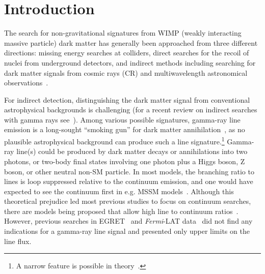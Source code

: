 \documentclass[aps,twocolumn,prd,superscriptaddress,showpacs,nofootinbib,fixfloat]{revtex4}
\newcommand{\Fermi}{{\slshape Fermi}}
\begin{document}

\maketitle




\section{Introduction}


The search for non-gravitational signatures from WIMP
(weakly interacting massive particle) dark matter has 
generally been approached from three different directions: missing
energy searches at colliders, direct searches for the
recoil of nuclei from underground detectors, and indirect
methods including searching for dark matter signals from cosmic
rays (CR) and multiwavelength astronomical
observations~\citep{Jungman:1995df, Bergstrom:2000, Bertone:2005, Hooper:2007Review,
2012arXiv1205.4882B, Cirelli:2012tf}.

For indirect detection, distinguishing the dark matter
signal from conventional astrophysical backgrounds is
challenging
(for a recent review on indirect searches with gamma rays
see~\cite{Bringmann:2012ez}).
Among various possible signatures, gamma-ray
line emission is a long-sought ``smoking
gun'' for dark matter annihilation~\cite{Bergstrom:1988fp}, as no plausible
astrophysical background can produce such a line
signature.\footnote{A narrow feature is
possible in theory~\citep[see][]{2012arXiv1207.0458A}.}  Gamma-ray line(s)
could be produced by dark matter decays or annihilations
into two photons, or two-body final states involving one
photon plus a Higgs boson, Z boson, or other neutral non-SM
particle.  In most models, the branching ratio
to lines is loop suppressed relative to the continuum
emission, and one would have expected to see the continuum
first in e.g. MSSM models~\citep[e.g.][]{Bergstrom:1997}.
Although this theoretical prejudice led most previous
studies to focus on continuum searches, there are models
being proposed that allow high line to continuum
ratios~\citep[e.g.][]{Bergstrom:1998, Bergstrom:2000,
Bertone:2009, Jackson:2010, Cline:2012, Weiner:2012}.
However, previous searches in EGRET~\cite{Pullen:2006sy} and \Fermi-LAT
data~\cite{Abdo:2010nc, Vertongen:2011mu, Ackermann:2012qk}
did not find any
indications for a gamma-ray line signal and presented only upper limits on the
line flux.
\end{document}
